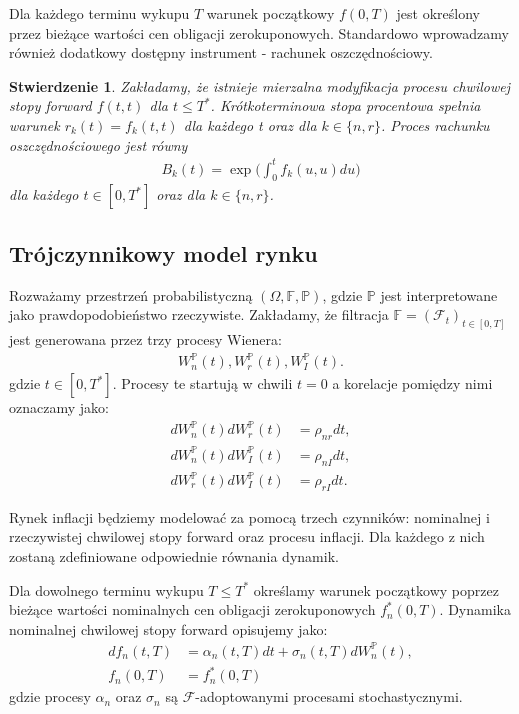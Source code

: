 \documentclass{mini}
\theoremstyle{mythstyle}
\newtheorem{Stwierdzenie}{Stwierdzenie}[chapter]
\begin{document}
	Dla każdego terminu wykupu $T$ warunek początkowy $f(0,T)$ jest określony przez bieżące wartości cen obligacji zerokuponowych. Standardowo wprowadzamy również dodatkowy dostępny instrument - rachunek oszczędnościowy. \\
	\begin{Stwierdzenie}
		Zakładamy, że istnieje mierzalna modyfikacja procesu chwilowej stopy forward $f(t,t)$ dla $t \le T^*$. Krótkoterminowa stopa procentowa spełnia warunek $r_k(t) = f_k(t,t)$ dla każdego t oraz dla $k \in \{n,r\}$. Proces rachunku oszczędnościowego jest równy
		\begin{eqnarray*}
			B_k(t) = \exp \bigg( \int_0^t f_k(u,u) du \bigg)
		\end{eqnarray*}
		dla każdego $t \in [0,T^*] $ oraz dla $k \in \{n,r\}$. 
	\end{Stwierdzenie}

	\subsection*{Trójczynnikowy model rynku}
	
	Rozważamy przestrzeń probabilistyczną  $(\Omega,\mathbb{F},\mathbb{P})$, gdzie $\mathbb{P}$ jest interpretowane jako prawdopodobieństwo rzeczywiste. Zakładamy, że filtracja $\mathbb{F} = (\mathcal{F}_t)_{t \in [0,T]}$ jest generowana przez trzy procesy Wienera:
	 \begin{eqnarray*}
		 W_n^{\mathbb{P}}(t), W_r^{\mathbb{P}}(t), W_I^{\mathbb{P}}(t).
	\end{eqnarray*}
	 gdzie $t \in [0,T^*]$. Procesy te startują w chwili $t = 0$ a korelacje pomiędzy nimi oznaczamy jako:
	\begin{align*}
		 dW_n^{\mathbb{P}}(t) dW_r^{\mathbb{P}}(t) &= \rho_{nr}dt, \\
		 dW_n^{\mathbb{P}}(t) dW_I^{\mathbb{P}}(t) &= \rho_{nI}dt, \\
		 dW_r^{\mathbb{P}}(t) dW_I^{\mathbb{P}}(t) &= \rho_{rI}dt.
	\end{align*}
	
	Rynek inflacji będziemy modelować za pomocą trzech czynników: nominalnej i rzeczywistej chwilowej stopy forward oraz procesu inflacji. Dla każdego z nich zostaną zdefiniowane odpowiednie równania dynamik.
	
	Dla dowolnego terminu wykupu $T \le T^*$ określamy warunek początkowy poprzez bieżące wartości nominalnych cen obligacji zerokuponowych $f_n^*(0,T)$. Dynamika nominalnej chwilowej stopy forward opisujemy jako:
	\begin{align*}
		df_n(t,T) &= \alpha_n(t,T)dt + \sigma_n(t,T) dW_n^{\mathbb{P}}(t),\\
		f_n(0,T)  &= f_n^*(0,T)
	\end{align*}
	gdzie procesy $\alpha_n$ oraz $\sigma_n$ są $\mathcal{F}$-adoptowanymi procesami stochastycznymi.
		
\end{document}
